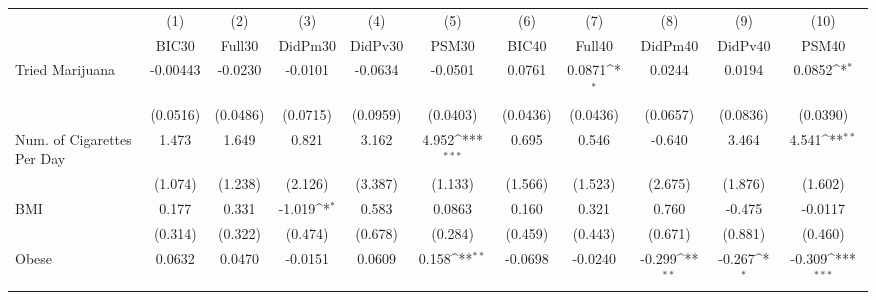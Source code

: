 {
\def\sym#1{\ifmmode^{#1}\else\(^{#1}\)\fi}
\begin{tabular}{l*{10}{c}}
\toprule
            &\multicolumn{1}{c}{(1)}&\multicolumn{1}{c}{(2)}&\multicolumn{1}{c}{(3)}&\multicolumn{1}{c}{(4)}&\multicolumn{1}{c}{(5)}&\multicolumn{1}{c}{(6)}&\multicolumn{1}{c}{(7)}&\multicolumn{1}{c}{(8)}&\multicolumn{1}{c}{(9)}&\multicolumn{1}{c}{(10)}\\
            &\multicolumn{1}{c}{BIC30}&\multicolumn{1}{c}{Full30}&\multicolumn{1}{c}{DidPm30}&\multicolumn{1}{c}{DidPv30}&\multicolumn{1}{c}{PSM30}&\multicolumn{1}{c}{BIC40}&\multicolumn{1}{c}{Full40}&\multicolumn{1}{c}{DidPm40}&\multicolumn{1}{c}{DidPv40}&\multicolumn{1}{c}{PSM40}\\
\midrule
Tried Marijuana&    -0.00443         &     -0.0230         &     -0.0101         &     -0.0634         &     -0.0501         &      0.0761         &      0.0871\sym{*}  &      0.0244         &      0.0194         &      0.0852\sym{*}  \\
            &    (0.0516)         &    (0.0486)         &    (0.0715)         &    (0.0959)         &    (0.0403)         &    (0.0436)         &    (0.0436)         &    (0.0657)         &    (0.0836)         &    (0.0390)         \\
\addlinespace
Num. of Cigarettes Per Day&       1.473         &       1.649         &       0.821         &       3.162         &       4.952\sym{***}&       0.695         &       0.546         &      -0.640         &       3.464         &       4.541\sym{**} \\
            &     (1.074)         &     (1.238)         &     (2.126)         &     (3.387)         &     (1.133)         &     (1.566)         &     (1.523)         &     (2.675)         &     (1.876)         &     (1.602)         \\
\addlinespace
BMI         &       0.177         &       0.331         &      -1.019\sym{*}  &       0.583         &      0.0863         &       0.160         &       0.321         &       0.760         &      -0.475         &     -0.0117         \\
            &     (0.314)         &     (0.322)         &     (0.474)         &     (0.678)         &     (0.284)         &     (0.459)         &     (0.443)         &     (0.671)         &     (0.881)         &     (0.460)         \\
\addlinespace
Obese       &      0.0632         &      0.0470         &     -0.0151         &      0.0609         &       0.158\sym{**} &     -0.0698         &     -0.0240         &      -0.299\sym{**} &      -0.267\sym{*}  &      -0.309\sym{***}\\

\end{tabular}}
